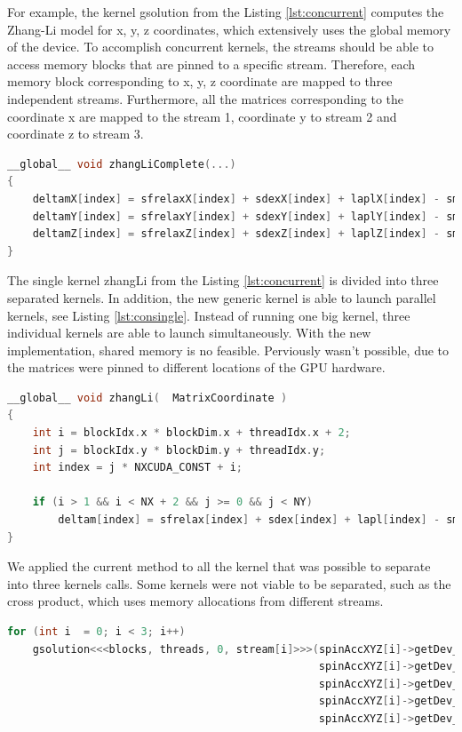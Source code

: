For example, the kernel {\listf gsolution} from the Listing \ref{lst:concurrent} computes the Zhang-Li model for x, y, z coordinates, which extensively uses the global memory of the device. To accomplish concurrent kernels, the streams should be able to access memory blocks that are pinned to a specific stream. Therefore, each memory block corresponding to x, y, z coordinate are mapped to three independent streams. Furthermore, all the matrices corresponding to the coordinate x are mapped to the stream 1, coordinate y to stream 2 and coordinate z to stream 3.

\begin{lstlisting}[language=C++, label={lst:concurrent}, caption={Evaluation of x, y, z coordinates of the Zhang and Li model in a single kernel.}]
__global__ void zhangLiComplete(...)
{
	deltamX[index] = sfrelaxX[index] + sdexX[index] + laplX[index] - smX[index];
	deltamY[index] = sfrelaxY[index] + sdexY[index] + laplY[index] - smY[index];
	deltamZ[index] = sfrelaxZ[index] + sdexZ[index] + laplZ[index] - smZ[index];
}
\end{lstlisting}
 
The single kernel {\listf zhangLi} from the Listing \ref{lst:concurrent} is divided into three separated kernels. In addition, the new generic kernel is able to launch parallel kernels, see Listing \ref{lst:consingle}. Instead of running one big kernel, three individual kernels are able to launch simultaneously. With the new implementation, shared memory is no feasible. Perviously wasn't possible, due to the matrices were pinned to different locations of the GPU hardware. 

\begin{lstlisting}[language=C++, label={lst:consingle}, caption={Evaluation of individual coordinates of the Zhang and Li model.}]
__global__ void zhangLi(  MatrixCoordinate )
{
	int i = blockIdx.x * blockDim.x + threadIdx.x + 2;
	int j = blockIdx.y * blockDim.y + threadIdx.y;
	int index = j * NXCUDA_CONST + i;

	if (i > 1 && i < NX + 2 && j >= 0 && j < NY)
		deltam[index] = sfrelax[index] + sdex[index] + lapl[index] - sm[index];
}
\end{lstlisting}

We applied the current method to all the kernel that was possible to separate into three kernels calls. Some kernels were not viable to be separated, such as the cross product, which uses memory allocations from different streams.

\begin{lstlisting}[language=C++, caption={Evaluate Zhang and Li model.}]
for (int i  = 0; i < 3; i++)
	gsolution<<<blocks, threads, 0, stream[i]>>>(spinAccXYZ[i]->getDev_deltam(),
												 spinAccXYZ[i]->getDev_sfrelax(), 
												 spinAccXYZ[i]->getDev_sm(), 
											 	 spinAccXYZ[i]->getDev_sdex(),
											 	 spinAccXYZ[i]->getDev_lapl());
\end{lstlisting}

